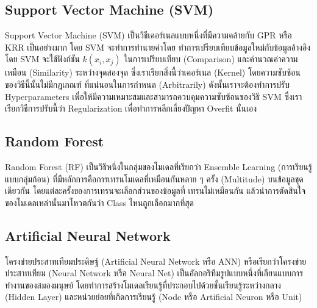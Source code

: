 \subsection{Support Vector Machine (SVM)}
\label{sec:svm}

Support Vector Machine (SVM) เป็นวิธีเคอร์เนลแบบหนึ่งที่มีความคล้ายกับ GPR หรือ KRR เป็นอย่างมาก โดย SVM จะทำการทำนายค่าโดย%
ทำการเปรียบเทียบข้อมูลใหม่กับข้อมูลอ้างอิง โดย SVM จะใช้ฟังก์ชัน $k(x_{i},x_{j})$ ในการเปรียบเทียบ (Comparison) 
และคำนวณค่าความเหมือน (Similarity) ระหว่างจุดสองจุด ซึ่งเราเรียกสิ่งนี้ว่าเคอร์เนล (Kernel) โดยความซับซ้อนของวิธีนี้นั้นไม่มีกฎเกณฑ์%
ที่แน่นอนในการกำหนด (Arbitrarily) ดังนั้นเราจะต้องทำการปรับ Hyperparameters เพื่อให้มีความเหมาะสมและสามารถควบคุมความซับซ้อนของวิธี 
SVM ซึ่งเราเรียกวิธีการปรับนี้ว่า Regularization เพื่อทำการหลีกเลี่ยงปัญหา Overfit นั่นเอง

\subsection{Random Forest}
\label{sec:rs}

Random Forest (RF) เป็นวิธีหนึ่งในกลุ่มของโมเดลที่เรียกว่า Ensemble Learning (การเรียนรู้แบบกลุ่มก้อน) 
ที่มีหลักการคือการเทรนโมเดลที่เหมือนกันหลาย ๆ ครั้ง (Multitude) บนข้อมูลชุดเดียวกัน โดยแต่ละครั้งของการเทรนจะเลือกส่วนของข้อมูลที่%
เทรนไม่เหมือนกัน แล้วนำการตัดสินใจของโมเดลเหล่านั้นมาโหวตกันว่า Class ไหนถูกเลือกมากที่สุด\autocite{breiman2001,quinlan1986}

\subsection{Artificial Neural Network}
\label{sec:ann}

โครงข่ายประสาทเทียมประดิษฐ์ (Artificial Neural Network หรือ ANN) หรือเรียกว่าโครงข่ายประสาทเทียม (Neural Network หรือ 
Neural Net) เป็นอัลกอริทึมรูปแบบหนึ่งที่เลียนแบบการทำงานของสมองมนุษย์ โดยทำการสร้างโมเดลเรียนรู้ที่ประกอบไปด้วยชั้นเรียนรู้ระหว่างกลาง 
(Hidden Layer) และหน่วยย่อยที่เกิดการเรียนรู้ (Node หรือ Artificial Neuron หรือ Unit)

